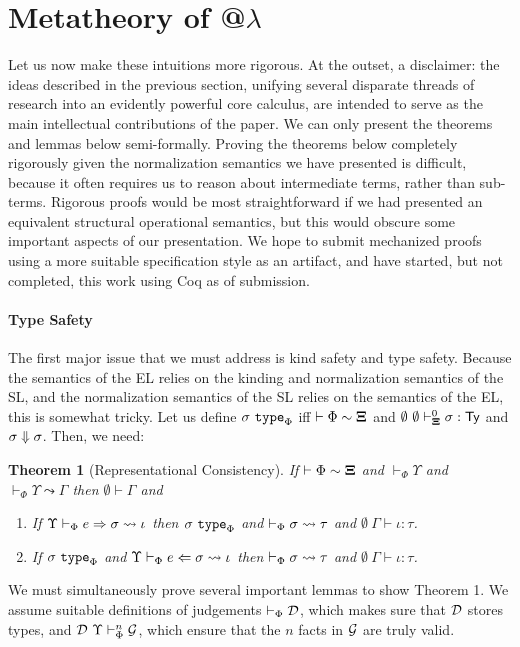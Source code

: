 \documentclass[9pt,preprint]{sigplanconf}
\newtheorem{theorem}{Theorem}
\begin{document}
\section{Metatheory of @$\lambda$}\label{calculus}
Let us now make these intuitions more rigorous. At the outset, a disclaimer: the {ideas} described in the previous section, unifying several disparate threads of research into an evidently powerful core calculus, are intended to serve as the main intellectual contributions of the paper. We can only present the theorems and lemmas below semi-formally. Proving the theorems below completely rigorously given the normalization semantics we have presented is difficult, because it often requires us to reason about  intermediate terms, rather than sub-terms. Rigorous proofs would be most straightforward if we had presented an equivalent structural operational semantics, but this would obscure some important aspects of our presentation. We hope to submit mechanized proofs using a more suitable specification style as an artifact, and have started, but not completed, this work using Coq as of submission.

 \paragraph{Type Safety} The first major issue that we must address is kind safety and type safety. Because the semantics of the EL relies on the kinding and normalization semantics of the SL, and the normalization semantics of the SL relies on the semantics of the EL, this is somewhat tricky.
Let us define $\sigma~\mathtt{type}_{\Phi}$ iff $\vdash \Phi \sim \boldsymbol\Xi$ and $\emptyset~\emptyset \vdash_{\boldsymbol\Xi}^{0} \sigma : {\sf Ty}$ and $\sigma \Downarrow \sigma$. Then, we need: 
\begin{theorem}[Representational Consistency]
If $\vdash \Phi \sim \boldsymbol\Xi$ and $\vdash_\Phi \Upsilon$ and $\vdash_\Phi \Upsilon \leadsto \Gamma$ then $\emptyset \vdash \Gamma$ and \begin{enumerate}
\item If $\Upsilon \vdash_{\Phi} e \Rightarrow \sigma \leadsto \iota$ then $\sigma~\mathtt{type}_{\Phi}$ and $\vdash_\Phi \sigma \leadsto \tau$ and $\emptyset~\Gamma \vdash \iota : \tau$.
\item If $\sigma~\mathtt{type}_{\Phi}$ and $\Upsilon \vdash_{\Phi} e \Leftarrow \sigma \leadsto \iota$ then $\vdash_\Phi \sigma \leadsto \tau$ and    $\emptyset~\Gamma \vdash \iota : \tau$.
\end{enumerate}
\end{theorem}
We must simultaneously prove several important lemmas to show Theorem 1. We assume suitable definitions of judgements $\vdash_\Phi \mathcal{D}$, which makes sure that $\mathcal{D}$ stores types, and $\mathcal{D}~\Upsilon \vdash_\Phi^n \mathcal{G}$, which ensure that the $n$ facts in $\mathcal{G}$ are truly valid.
\end{document}
